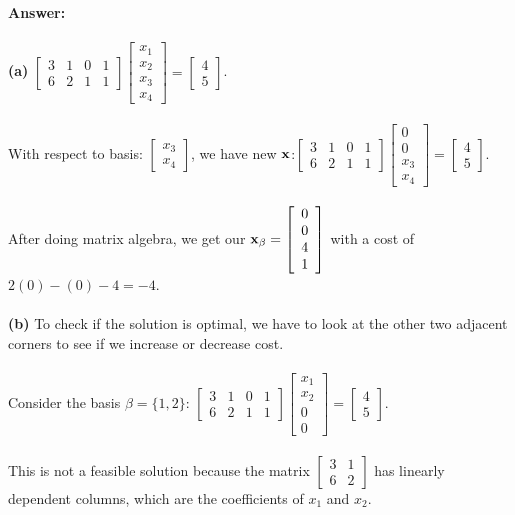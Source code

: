 \documentclass[12pt]{article}
\newcommand{\bfx}{{\bf x}}
\begin{document}
\bigskip
\noindent\textbf{Answer:} 
\\~\\\textbf{(a)} $\left[\begin{array}{cccc}{3} & {1} & {0} & {1}\\ {6} & {2} & {1} & {1}\end{array}\right]\left[\begin{array}{c}{x_1} \\ {x_2} \\ {x_3} \\ {x_4}\end{array}\right]=\left[\begin{array}{c}{4} \\ {5}\end{array}\right]$.
\\~\\With respect to basis: $\left[\begin{array}{c}{x_3} \\ {x_4}\end{array}\right]$, we have new $\bfx$:$\left[\begin{array}{cccc}{3} & {1} & {0} & {1}\\ {6} & {2} & {1} & {1}\end{array}\right]\left[\begin{array}{c}{0} \\ {0} \\ {x_3} \\ {x_4}\end{array}\right]=\left[\begin{array}{c}{4} \\ {5}\end{array}\right]$.
\\~\\After doing matrix algebra, we get our $\bfx_\beta=\left[\begin{array}{c}{0} \\ {0} \\ {4} \\ {1}\end{array}\right]$ with a cost of $2(0)-(0)-4=-4$.
\\~\\\textbf{(b)} To check if the solution is optimal, we have to look at the other two adjacent corners to see if we increase or decrease cost.
\\~\\Consider the basis $\beta=\{1, 2\}$: $\left[\begin{array}{cccc}{3} & {1} & {0} & {1}\\ {6} & {2} & {1} & {1}\end{array}\right]\left[\begin{array}{c}{x_1} \\ {x_2} \\ {0} \\ {0}\end{array}\right]=\left[\begin{array}{c}{4} \\ {5}\end{array}\right]$. 
\\~\\This is not a feasible solution because the matrix $\left[\begin{array}{cc}{3} & {1} \\ {6} & {2}\end{array}\right]$ has linearly dependent columns, which are the coefficients of $x_1$ and $x_2$.
\end{document}
